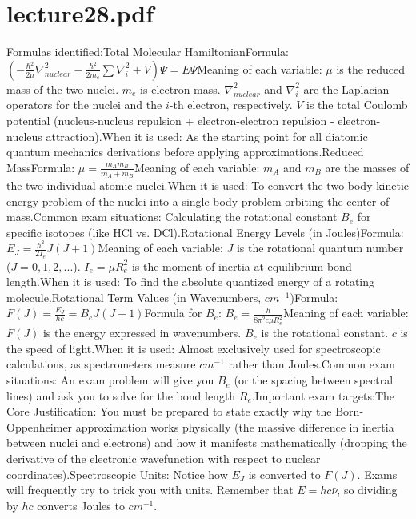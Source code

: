 \documentclass[11pt, a4paper]{report}
\begin{document}
\chapter{lecture28.pdf}
Formulas identified:Total Molecular HamiltonianFormula: $\left( -\frac{\hbar^2}{2\mu}\nabla_{nuclear}^2 - \frac{\hbar^2}{2m_e}\sum \nabla_i^2 + V \right)\Psi = E\Psi$Meaning of each variable: $\mu$ is the reduced mass of the two nuclei. $m_e$ is electron mass. $\nabla_{nuclear}^2$ and $\nabla_i^2$ are the Laplacian operators for the nuclei and the $i$-th electron, respectively. $V$ is the total Coulomb potential (nucleus-nucleus repulsion + electron-electron repulsion - electron-nucleus attraction).When it is used: As the starting point for all diatomic quantum mechanics derivations before applying approximations.Reduced MassFormula: $\mu = \frac{m_A m_B}{m_A + m_B}$Meaning of each variable: $m_A$ and $m_B$ are the masses of the two individual atomic nuclei.When it is used: To convert the two-body kinetic energy problem of the nuclei into a single-body problem orbiting the center of mass.Common exam situations: Calculating the rotational constant $B_e$ for specific isotopes (like HCl vs. DCl).Rotational Energy Levels (in Joules)Formula: $E_J = \frac{\hbar^2}{2I_e} J(J+1)$Meaning of each variable: $J$ is the rotational quantum number ($J = 0, 1, 2, ...$). $I_e = \mu R_e^2$ is the moment of inertia at equilibrium bond length.When it is used: To find the absolute quantized energy of a rotating molecule.Rotational Term Values (in Wavenumbers, $cm^{-1}$)Formula: $F(J) = \frac{E_J}{hc} = B_e J(J+1)$Formula for $B_e$: $B_e = \frac{h}{8\pi^2 c \mu R_e^2}$Meaning of each variable: $F(J)$ is the energy expressed in wavenumbers. $B_e$ is the rotational constant. $c$ is the speed of light.When it is used: Almost exclusively used for spectroscopic calculations, as spectrometers measure $cm^{-1}$ rather than Joules.Common exam situations: An exam problem will give you $B_e$ (or the spacing between spectral lines) and ask you to solve for the bond length $R_e$.Important exam targets:The Core Justification: You must be prepared to state exactly why the Born-Oppenheimer approximation works physically (the massive difference in inertia between nuclei and electrons) and how it manifests mathematically (dropping the derivative of the electronic wavefunction with respect to nuclear coordinates).Spectroscopic Units: Notice how $E_J$ is converted to $F(J)$. Exams will frequently try to trick you with units. Remember that $E = hc\bar{\nu}$, so dividing by $hc$ converts Joules to $cm^{-1}$.
\end{document}

